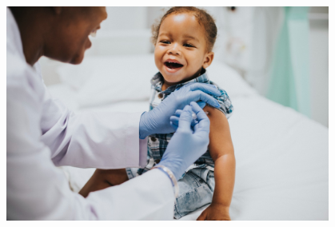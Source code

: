 \begin{myquote}



\begin{figure}[H]
\centering
\includegraphics[width=0.95\textwidth]{./imgSAEB_7_POR/media/image74.png}
\end{figure} 


\end{myquote}
